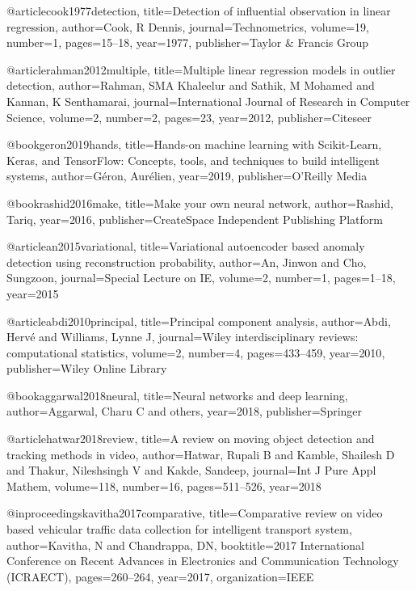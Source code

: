 @article{cook1977detection,
  title={Detection of influential observation in linear regression},
  author={Cook, R Dennis},
  journal={Technometrics},
  volume={19},
  number={1},
  pages={15--18},
  year={1977},
  publisher={Taylor \& Francis Group}
}

@article{rahman2012multiple,
  title={Multiple linear regression models in outlier detection},
  author={Rahman, SMA Khaleelur and Sathik, M Mohamed and Kannan, K Senthamarai},
  journal={International Journal of Research in Computer Science},
  volume={2},
  number={2},
  pages={23},
  year={2012},
  publisher={Citeseer}
}

@book{geron2019hands,
  title={Hands-on machine learning with Scikit-Learn, Keras, and TensorFlow: Concepts, tools, and techniques to build intelligent systems},
  author={G{\'e}ron, Aur{\'e}lien},
  year={2019},
  publisher={O'Reilly Media}
}

@book{rashid2016make,
  title={Make your own neural network},
  author={Rashid, Tariq},
  year={2016},
  publisher={CreateSpace Independent Publishing Platform}
}

@article{an2015variational,
  title={Variational autoencoder based anomaly detection using reconstruction probability},
  author={An, Jinwon and Cho, Sungzoon},
  journal={Special Lecture on IE},
  volume={2},
  number={1},
  pages={1--18},
  year={2015}
}

@article{abdi2010principal,
  title={Principal component analysis},
  author={Abdi, Herv{\'e} and Williams, Lynne J},
  journal={Wiley interdisciplinary reviews: computational statistics},
  volume={2},
  number={4},
  pages={433--459},
  year={2010},
  publisher={Wiley Online Library}
}

@book{aggarwal2018neural,
  title={Neural networks and deep learning},
  author={Aggarwal, Charu C and others},
  year={2018},
  publisher={Springer}
}

@article{hatwar2018review,
  title={A review on moving object detection and tracking methods in video},
  author={Hatwar, Rupali B and Kamble, Shailesh D and Thakur, Nileshsingh V and Kakde, Sandeep},
  journal={Int J Pure Appl Mathem},
  volume={118},
  number={16},
  pages={511--526},
  year={2018}
}

@inproceedings{kavitha2017comparative,
  title={Comparative review on video based vehicular traffic data collection for intelligent transport system},
  author={Kavitha, N and Chandrappa, DN},
  booktitle={2017 International Conference on Recent Advances in Electronics and Communication Technology (ICRAECT)},
  pages={260--264},
  year={2017},
  organization={IEEE}
}

